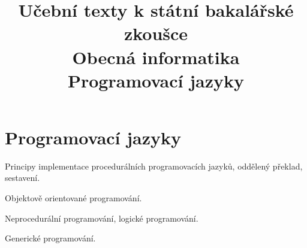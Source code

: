 \clearpage  \clearpage
\title{\LARGE Učební texty k státní bakalářské zkoušce \\ Obecná informatika \\ Programovací jazyky}

\maketitle
\newpage
\setcounter{section}{5}
\section{Programovací jazyky}
\begin{pozadavky}
\begin{pitemize}
\item Principy implementace procedurálních programovacích jazyků, oddělený překlad, sestavení.
\item Objektově orientované programování.
\item Neprocedurální programování, logické programování.
\item Generické programování.
\end{pitemize}
\end{pozadavky}






